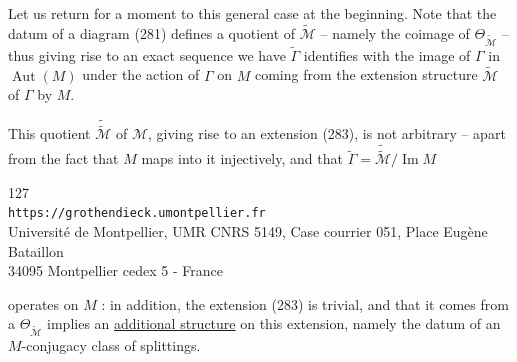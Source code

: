 Let us return for a moment to this general case at the beginning. Note that the datum of a diagram (281)  defines a quotient  of $\widetilde{\mathcal M}$ -- namely the coimage of $\Theta_{\widetilde{\mathcal M}}$ --   thus giving rise to an  exact sequence
 we have
$\widetilde\Gamma$ identifies with the image of $\Gamma$ in $\operatorname{Aut}(M)$ under the action of $\Gamma$ on $M$ coming from the extension structure $\widetilde{\mathcal M}$ of $\Gamma$ by $M$.

 This quotient $\widetilde{\widetilde{\mathcal M}}$ of $\mathcal M$, giving rise to an extension (283), is not arbitrary -- apart from the fact that $M$ maps into it injectively, and that $\widetilde\Gamma=\widetilde{\widetilde{\mathcal M}}/\operatorname{Im}M$


\begin{center}
\small
127\\
\texttt{https://grothendieck.umontpellier.fr}\\
Université de Montpellier, UMR CNRS 5149, Case courrier 051, Place Eugène Bataillon\\
34095 Montpellier cedex 5 - France
\end{center}


operates   on $M$ : in addition, the extension (283) is trivial, and   that it comes from a $\Theta_{\widetilde{\mathcal M}}$ implies an \uline{additional structure} on this extension, namely the datum of an $M$-conjugacy class of splittings.

